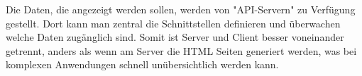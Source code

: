 Die Daten, die angezeigt werden sollen, werden von "API-Servern" zu Verfügung gestellt. Dort kann man zentral die Schnittstellen definieren und überwachen welche Daten zugänglich sind. Somit ist Server und Client besser voneinander getrennt, anders als wenn am Server die HTML Seiten generiert werden, was bei komplexen Anwendungen schnell unübersichtlich werden kann.

